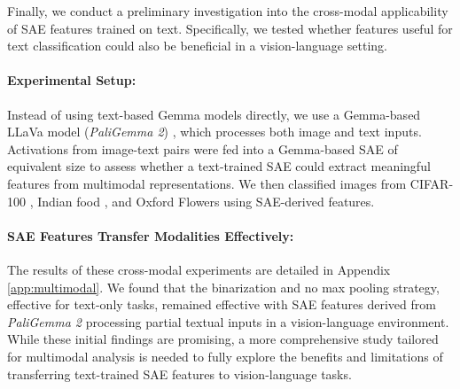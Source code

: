 Finally, we conduct a preliminary investigation into the cross-modal applicability of SAE features trained on text. Specifically, we tested whether features useful for text classification could also be beneficial in a vision-language setting.

\paragraph{Experimental Setup:}
Instead of using text-based Gemma models directly, we use a Gemma-based LLaVa model (\emph{PaliGemma 2}) \cite{liu2023improvedllava}, which processes both image and text inputs. Activations from image-text pairs were fed into a Gemma-based SAE of equivalent size to assess whether a text-trained SAE could extract meaningful features from multimodal representations. We then classified images from CIFAR-100 \cite{krizhevsky2009learning}, Indian food \cite{rajistics_indian_food_images}, and Oxford Flowers \cite{Nilsback08} using SAE-derived features.

\paragraph{SAE Features Transfer Modalities Effectively:}
The results of these cross-modal experiments are detailed in Appendix \ref{app:multimodal}. We found that the binarization and no max pooling strategy, effective for text-only tasks, remained effective with SAE features derived from \emph{PaliGemma 2} processing partial textual inputs in a vision-language environment. While these initial findings are promising, a more comprehensive study tailored for multimodal analysis is needed to fully explore the benefits and limitations of transferring text-trained SAE features to vision-language tasks.